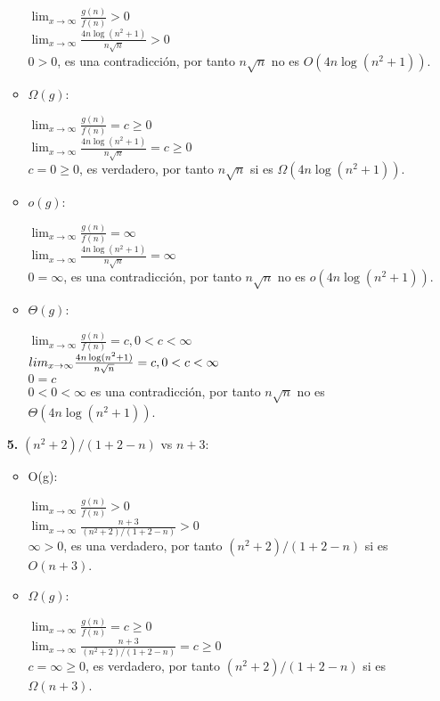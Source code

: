 \documentclass{article}
\begin{document}
\begin{enumerate}[label=\textbf{\alph*.}]
\begin{itemize}
        $\lim_{x\to\infty} \frac{g(n)}{f(n)}>0$\\
        $\lim_{x\to\infty} \frac{4n \log(n^2 +1)}{n\sqrt{n}}>0$\\
        $0>0$, es una contradicción, por tanto $n\sqrt{n}$ no es $O(4n \log(n^2 +1))$.

      \item $\Omega(g)$:
      
        $\lim_{x\to\infty} \frac{g(n)}{f(n)}=c \geq 0$\\
        $\lim_{x\to\infty} \frac{4n \log(n^2 +1)}{n\sqrt{n}}=c \geq 0$\\
        $c=0 \geq 0$, es verdadero, por tanto $n\sqrt{n}$ si es $\Omega(4n \log(n^2 +1))$.

      \item $o(g)$:
      
        $\lim_{x\to\infty} \frac{g(n)}{f(n)}=\infty$\\
        $\lim_{x\to\infty} \frac{4n \log(n^2 +1)}{n\sqrt{n}}=\infty$\\
        $0=\infty$, es una contradicción, por tanto $n\sqrt{n}$ no es $o(4n \log(n^2 +1))$.

      \item $\Theta(g)$:
      
        $\lim_{x\to\infty} \frac{g(n)}{f(n)}=c,0<c<\infty$\\
        $\\lim_{x\to\infty} \frac{4n \log(n^2 +1)}{n\sqrt{n}}=c,0<c<\infty$\\
        $0=c$\\
        $0<0<\infty$ es una contradicción, por tanto $n\sqrt{n}$ no es $\Theta(4n \log(n^2 +1))$.
    \end{itemize}
  
  \textbf{5.} $(n^2 +2)/(1+2-n)$ vs $n+3$:
    \begin{itemize}
      \item O(g):
      
        $\lim_{x\to\infty} \frac{g(n)}{f(n)}>0$\\
        $\lim_{x\to\infty} \frac{n+3}{(n^2 +2)/(1+2-n)}>0$\\
        $\infty>0$, es una verdadero, por tanto $(n^2 +2)/(1+2-n)$ si es $O(n+3)$.

      \item $\Omega(g)$:
      
        $\lim_{x\to\infty} \frac{g(n)}{f(n)}=c \geq 0$\\
        $\lim_{x\to\infty} \frac{n+3}{(n^2 +2)/(1+2-n)}=c \geq 0$\\
        $c=\infty \geq 0$, es verdadero, por tanto $(n^2 +2)/(1+2-n)$ si es $\Omega(n+3)$.


\end{itemize}
\end{enumerate}
\end{document}
